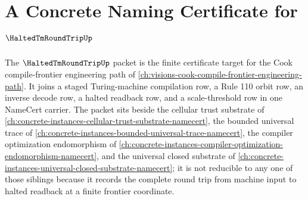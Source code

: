 \chapter{A Concrete Naming Certificate for $\HaltedTmRoundTripUp$}
\label{ch:concrete-instances-halted-tm-round-trip-namecert}

The $\HaltedTmRoundTripUp$ packet is the finite certificate target for the Cook compile-frontier engineering path of \autoref{ch:visions-cook-compile-frontier-engineering-path}. It joins a staged Turing-machine compilation row, a Rule 110 orbit row, an inverse decode row, a halted readback row, and a scale-threshold row in one NameCert carrier. The packet sits beside the cellular trust substrate of \autoref{ch:concrete-instances-cellular-trust-substrate-namecert}, the bounded universal trace of \autoref{ch:concrete-instances-bounded-universal-trace-namecert}, the compiler optimization endomorphism of \autoref{ch:concrete-instances-compiler-optimization-endomorphism-namecert}, and the universal closed substrate of \autoref{ch:concrete-instances-universal-closed-substrate-namecert}; it is not reducible to any one of those siblings because it records the complete round trip from machine input to halted readback at a finite frontier coordinate.



